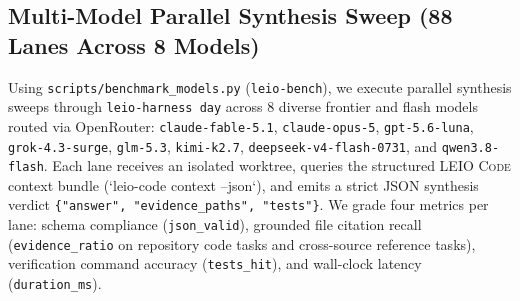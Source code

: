\documentclass[11pt]{article}
\begin{document}
\begin{table}[t]
\centering
\caption{Empirical verification of \textsc{SIGReg} sliced Epps--Pulley isotropy ($K=8, d=8, M=64$) and \textsc{EmbeddingGEPA} trust-region mutation in \texttt{leio-harness v2.6.5}.}
\label{tab:sigreg-gepa}
\end{table}

\subsection{Multi-Model Parallel Synthesis Sweep (88 Lanes Across 8 Models)}

Using \texttt{scripts/benchmark\_models.py} (\texttt{leio-bench}), we execute parallel synthesis sweeps through \texttt{leio-harness day} across 8 diverse frontier and flash models routed via OpenRouter: \texttt{claude-fable-5.1}, \texttt{claude-opus-5}, \texttt{gpt-5.6-luna}, \texttt{grok-4.3-surge}, \texttt{glm-5.3}, \texttt{kimi-k2.7}, \texttt{deepseek-v4-flash-0731}, and \texttt{qwen3.8-flash}. Each lane receives an isolated worktree, queries the structured \textsc{LEIO Code} context bundle (`leio-code context --json`), and emits a strict JSON synthesis verdict \texttt{\{"answer", "evidence\_paths", "tests"\}}. We grade four metrics per lane: schema compliance (\texttt{json\_valid}), grounded file citation recall (\texttt{evidence\_ratio} on repository code tasks and cross-source reference tasks), verification command accuracy (\texttt{tests\_hit}), and wall-clock latency (\texttt{duration\_ms}).
\end{document}
